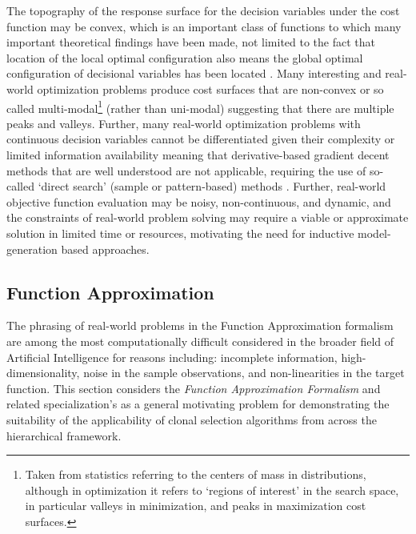 \documentclass[a4paper, 11pt]{article}
\begin{document}
The topography of the response surface for the decision variables under the cost function may be convex, which is an important class of functions to which many important theoretical findings have been made, not limited to the fact that location of the local optimal configuration also means the global optimal configuration of decisional variables has been located \cite{Boyd2004}. Many interesting and real-world optimization problems produce cost surfaces that are non-convex or so called multi-modal\footnote{Taken from statistics referring to the centers of mass in distributions, although in optimization it refers to `regions of interest' in the search space, in particular valleys in minimization, and peaks in maximization cost surfaces.} (rather than uni-modal) suggesting that there are multiple peaks and valleys. Further, many real-world optimization problems with continuous decision variables cannot be differentiated given their complexity or limited information availability meaning that derivative-based gradient decent methods that are well understood are not applicable, requiring the use of so-called `direct search' (sample or pattern-based) methods \cite{Lewis2000}. Further, real-world objective function evaluation may be noisy, non-continuous, and dynamic, and the constraints of real-world problem solving may require a viable or approximate solution in limited time or resources, motivating the need for inductive model-generation based approaches.


% 
%
\subsection{Function Approximation}
\label{subsec:function_approximation}
The phrasing of real-world problems in the Function Approximation formalism are among the most computationally difficult considered in the broader field of Artificial Intelligence for reasons including: incomplete information, high-dimensionality, noise in the sample observations, and non-linearities in the target function.
This section considers the \emph{Function Approximation Formalism} and related specialization's as a general motivating problem for demonstrating the suitability of the applicability of clonal selection algorithms from across the hierarchical framework.

%
%
\end{document}
